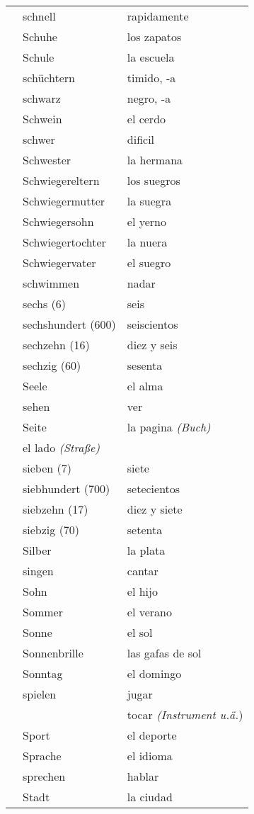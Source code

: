 \documentclass[10pt,spanish]{article}
\begin{document}
\begin{longtable}{p{} p{} | p{}}
& schnell & rapidamente  \\
& Schuhe & los zapatos  \\
& Schule & la escuela  \\
& schüchtern & timido, -a\\
& schwarz & negro, -a  \\
& Schwein & el cerdo \\
& schwer & dificil  \\
& Schwester & la hermana  \\
& Schwiegereltern & los suegros  \\
& Schwiegermutter & la suegra  \\
& Schwiegersohn & el yerno  \\
& Schwiegertochter & la nuera  \\
& Schwiegervater & el suegro  \\
& schwimmen & nadar  \\
& sechs (6) & seis  \\
& sechshundert (600) & seiscientos   \\
& sechzehn (16) & diez y seis  \\
& sechzig (60) & sesenta  \\
& Seele & el alma  \\
& sehen & ver \\
& Seite & la pagina \textit{(Buch)} \\
& el lado \textit{(Straße)} \\
& sieben (7) & siete  \\
& siebhundert (700) & setecientos  \\
& siebzehn (17) & diez y siete  \\
& siebzig (70) & setenta  \\
& Silber & la plata  \\
& singen & cantar  \\
& Sohn & el hijo  \\
& Sommer & el verano  \\
& Sonne & el sol  \\
& Sonnenbrille & las gafas de sol \\
& Sonntag & el domingo  \\
& spielen & jugar  \\
& & tocar \textit{(Instrument u.ä.}) \\
& Sport & el deporte  \\
& Sprache & el idioma  \\
& sprechen & hablar  \\
& Stadt & la ciudad \\

\end{longtable}
\end{document}

